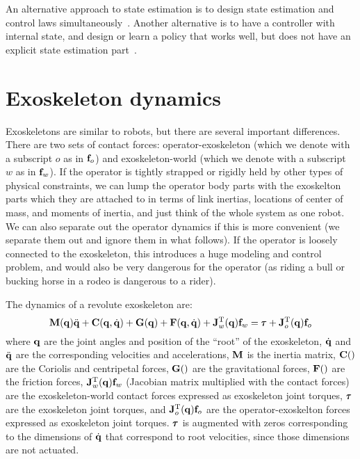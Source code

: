 \documentclass[letterpaper,12pt,fullpage]{article}
\begin{document}
An alternative approach to state estimation is to design state estimation
and control laws simultaneously~\cite{LQG-LTR}. Another alternative is
to have a controller with internal state, and design or learn a policy
that works well, but does not have an explicit state estimation 
part~\cite{lead-lag}.

\section{Exoskeleton dynamics}

Exoskeletons are similar to robots, but there are several important differences.
There are two sets of contact forces: operator-exoskeleton (which we denote
with a subscript $o$ as in ${\bf f}_o$) and exoskeleton-world (which we denote
with a subscript $w$ as in ${\bf f}_w$). If the operator is tightly strapped or
rigidly held by other types of physical constraints, we can lump the operator
body parts with the exoskelton parts which they are attached to in terms
of link inertias, locations of center of mass, and moments of inertia,
and just think of the whole system as one robot.
We can also separate out the operator dynamics if this is more convenient
(we separate them out and ignore them in what follows).
If the operator is loosely connected to the exoskeleton, this introduces a
huge modeling and control problem, and would also be very dangerous for the
operator (as riding a bull or bucking horse in a rodeo is dangerous to a rider).

The dynamics of a revolute exoskeleton are:
\begin{equation}
\mM(\vq) \ddot{\vq} + \mC(\vq,\dot{\vq}) + \mG(\vq) + \mF(\vq,\dot{\vq})
+ \mJ_w^{\tr}(\vq) \vf_w = \vtau + \mJ_o^{\tr}(\vq) \vf_o
\label{eq:dynamics}
\end{equation}
where ${\bf q}$ are the joint angles and position of the ``root'' of
the exoskeleton, $\dot{{\bf q}}$ and $\ddot{{\bf q}}$ are the corresponding
velocities and accelerations, ${\bf M}$ is the inertia matrix, ${\bf C}()$ are the Coriolis and
centripetal forces, ${\bf G}()$ are the gravitational forces, ${\bf F}()$ are the
friction forces, ${\bf J}_w^{{\rm T}}({\bf q}) {\bf f}_w$ (Jacobian matrix multiplied with the
contact forces)
are the exoskeleton-world
contact forces 
expressed as exoskeleton joint torques, 
$\vtau$ are the exoskeleton
joint torques,
and ${\bf J}_o^{{\rm T}}({\bf q}) {\bf f}_o$
are the operator-exoskelton forces expressed
as exoskeleton joint torques.
$\vtau$ is augmented with zeros corresponding to the dimensions of $\dot{{\bf q}}$
that correspond to root velocities, since those dimensions are not actuated.
\end{document}
